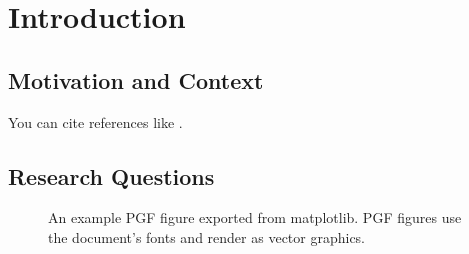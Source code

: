 \chapter{Introduction}\label{introduction}

\section{Motivation and Context}


You can cite references like \cite{thelenAIxcellentVibesGermEval2025}.

\section{Research Questions}


%
%
%

\begin{figure}[ht]
    \centering
    \caption{An example PGF figure exported from matplotlib. PGF figures use
             the document's fonts and render as vector graphics.}
    \label{fig:pgf_example}
\end{figure}


%


